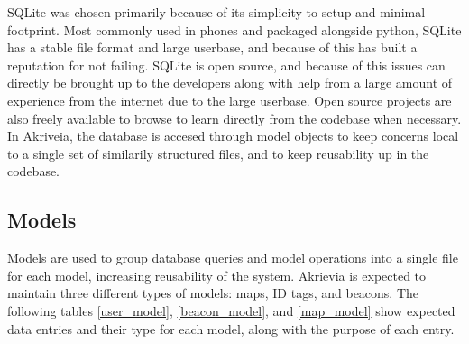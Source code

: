 \bigskip
SQLite was chosen primarily because of its simplicity to setup and minimal footprint.
Most commonly used in phones and packaged alongside python, SQLite has a stable file format and large userbase, and because of this has built a reputation for not failing.
SQLite is open source, and because of this issues can directly be brought up to the developers along with help from a large amount of experience from the internet due to the large userbase.
Open source projects are also freely available to browse to learn directly from the codebase when necessary.
In Akriveia, the database is accesed through model objects to keep concerns local to a single set of similarily structured files, and to keep reusability up in the codebase.

\bigskip
\subsection{Models}
Models are used to group database queries and model operations into a single file for each model, increasing reusability of the system.
Akrievia is expected to maintain three different types of models: maps, ID tags, and beacons.
The following tables \ref{user_model}, \ref{beacon_model}, and \ref{map_model} show expected data entries and their type for each model, along with the purpose of each entry.

